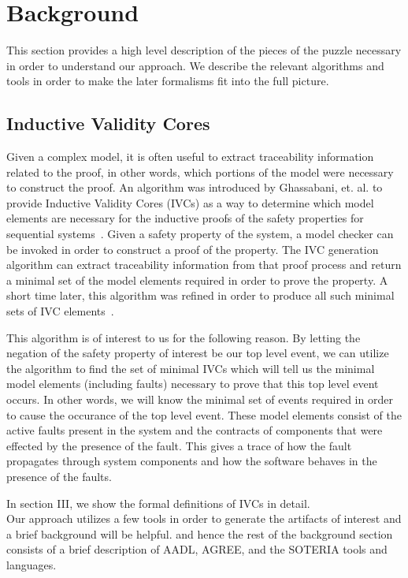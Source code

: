 \section{Background}
This section provides a high level description of the pieces of the puzzle necessary in order to understand our approach. We describe the relevant algorithms and tools in order to make the later formalisms fit into the full picture. 

\subsection{Inductive Validity Cores}

Given a complex model, it is often useful to extract traceability information related to the proof, in other words, which portions of the model were necessary to construct the proof. An algorithm was introduced by Ghassabani, et. al. to provide Inductive Validity Cores (IVCs) as a way to determine which model elements are necessary for the inductive proofs of the safety properties for sequential systems~\cite{GhassabaniGW16}. Given a safety property of the system, a model checker can be invoked in order to construct a proof of the property. The IVC generation algorithm can extract traceability information from that proof process and return a minimal set of the model elements required in order to prove the property. A short time later, this algorithm was refined in order to produce all such minimal sets of IVC elements~\cite{Ghassabani2017EfficientGO}. 

This algorithm is of interest to us for the following reason. By letting the negation of the safety property of interest be our top level event, we can utilize the algorithm to find the set of minimal IVCs which will tell us the minimal model elements (including faults) necessary to prove that this top level event occurs. In other words, we will know the minimal set of events required in order to cause the occurance of the top level event. These model elements consist of the active faults present in the system and the contracts of components that were effected by the presence of the fault. This gives a trace of how the fault propagates through system components and how the software behaves in the presence of the faults. 

In section III, we show the formal definitions of IVCs in detail. \\

Our approach utilizes a few tools in order to generate the artifacts of interest and a brief background will be helpful. and hence the rest of the background section consists of a brief description of AADL, AGREE, and the SOTERIA tools and languages. 

